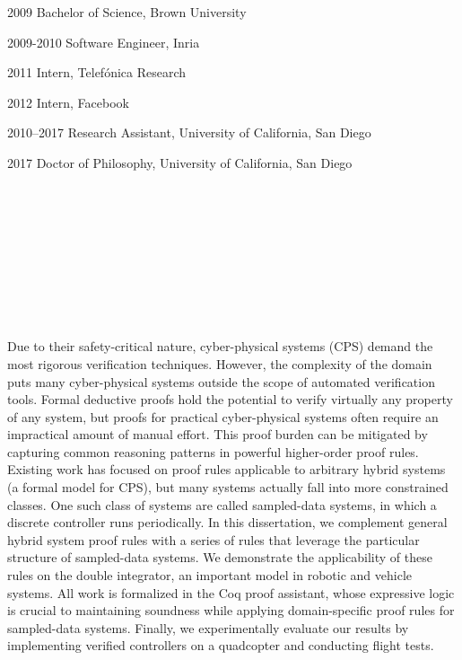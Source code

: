 \documentclass[12pt]{ucsddissertation}
\begin{document}
\begin{vita}
\noindent
\begin{cv}{}
\begin{cvlist}{}
\item[2009] Bachelor of Science, Brown University
\item[2009-2010] Software Engineer, Inria
\item[2011] Intern, Telef\'onica Research
\item[2012] Intern, Facebook
\item[2010--2017] Research Assistant, University of California, San
Diego
\item[2017] Doctor of Philosophy, University of California, San Diego
\end{cvlist}
\end{cv}

\publications
\noindent{}
\\ \\
\noindent{}
\\ \\
\noindent{}
\\ \\
\noindent{}
\\ \\
\noindent{}

\end{vita}

\begin{dissertationabstract}
Due to their safety-critical nature, cyber-physical systems (CPS) demand
the most rigorous verification techniques. However, the complexity of the
domain puts many cyber-physical systems outside the scope of automated
verification tools. Formal deductive proofs hold the potential to verify
virtually any property of any system, but proofs for practical
cyber-physical systems often require an impractical amount of manual
effort. This proof burden can be mitigated by capturing common reasoning
patterns in powerful higher-order proof rules. Existing work has focused on
proof rules applicable to arbitrary hybrid systems (a formal model for
CPS), but many systems actually fall into more constrained classes. One
such class of systems are called sampled-data systems, in which a discrete
controller runs periodically. In this dissertation, we complement general
hybrid system proof rules with a series of rules that leverage the
particular structure of sampled-data systems. We demonstrate the
applicability of these rules on the double integrator, an important model
in robotic and vehicle systems. All work is formalized in the Coq proof
assistant, whose expressive logic is crucial to maintaining soundness while
applying domain-specific proof rules for sampled-data systems. Finally, we
experimentally evaluate our results by implementing verified controllers on
a quadcopter and conducting flight tests.
\end{dissertationabstract}
\end{document}
